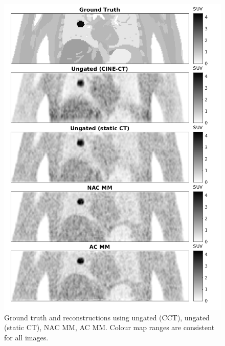             \begin{figure}
                \centering
                
                \includegraphics[width=1.0\linewidth]{figures/motion_correction_1_results_2_visual_analysis.png}
                
                \captionsetup{singlelinecheck=false}
                \caption{
                    Ground truth and reconstructions using ungated (\gls{CCT}), ungated (static \gls{CT}), \gls{NAC} \gls{MM}, \gls{AC} \gls{MM}. Colour map ranges are consistent for all images.
                }
                \label{fig:pet_ct_respiratory_motion_correction_with_a_single_attenuation_map_using_nac_derived_deformation_fields_results_visual_analysis}
            \end{figure}
            
